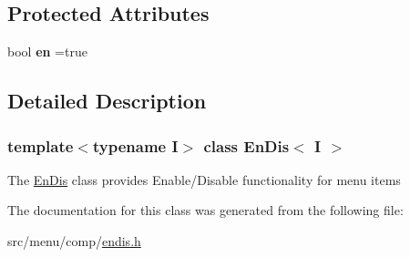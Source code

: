 \subsection*{Protected Attributes}
\begin{DoxyCompactItemize}
\item 
\mbox{\label{classEnDis_a37d732bf58a16934cac2c873a49704ee}} 
bool {\bfseries en} =true
\end{DoxyCompactItemize}


\subsection{Detailed Description}
\subsubsection*{template$<$typename I$>$\newline
class En\+Dis$<$ I $>$}

The \hyperlink{classEnDis}{En\+Dis} class provides Enable/\+Disable functionality for menu items 

The documentation for this class was generated from the following file\+:\begin{DoxyCompactItemize}
\item 
src/menu/comp/\hyperlink{endis_8h}{endis.\+h}\end{DoxyCompactItemize}
